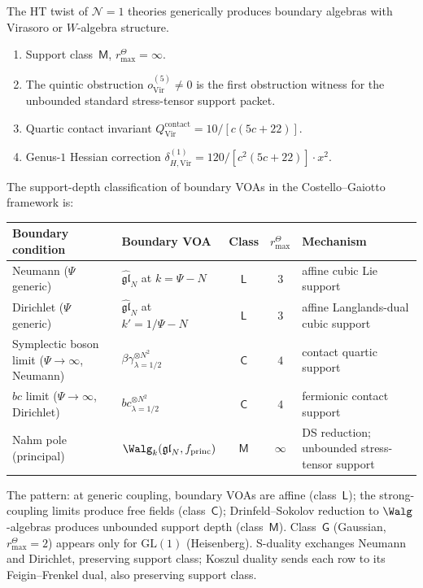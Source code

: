 \begin{example}[$\mathcal{N}=1$: Virasoro/W-type]
\label{ex:ht-n1}
The HT twist of $\mathcal{N}=1$ theories generically produces
boundary algebras with Virasoro or $W$-algebra structure.
\begin{enumerate}[label=\textup{(\roman*)}]
\item Support class~$\mathsf{M}$, \(r^\Theta_{\max}=\infty\).
\item The quintic obstruction $o^{(5)}_{\mathrm{Vir}} \neq 0$
 is the first obstruction witness for the unbounded standard
 stress-tensor support packet.
\item Quartic contact invariant
 $Q^{\mathrm{contact}}_{\mathrm{Vir}} = 10/[c(5c+22)]$.
\item Genus-$1$ Hessian correction
 $\delta^{(1)}_{H,\mathrm{Vir}} = 120/[c^2(5c+22)] \cdot x^2$.
\end{enumerate}
\end{example}

\begin{remark}
\label{rem:boundary-voa-shadow-depth-classification}
The support-depth classification of boundary VOAs in the
Costello--Gaiotto framework is:
\begin{center}
\renewcommand{\arraystretch}{1.25}
\small
\begin{tabular}{@{}l@{\;\;}l@{\;\;}c@{\;\;}c@{\;\;}l@{}}
\textbf{Boundary condition}
 & \textbf{Boundary VOA}
 & \textbf{Class}
 & \(r^\Theta_{\max}\)
 & \textbf{Mechanism} \\
\midrule
Neumann ($\Psi$ generic)
 & $\widehat{\mathfrak{gl}}_N$ at $k = \Psi - N$
 & $\mathsf{L}$
 & $3$
 & affine cubic Lie support \\
Dirichlet ($\Psi$ generic)
 & $\widehat{\mathfrak{gl}}_N$ at $k' = 1/\Psi - N$
 & $\mathsf{L}$
 & $3$
 & affine Langlands-dual cubic support \\
Symplectic boson limit ($\Psi\to\infty$, Neumann)
 & $\beta\gamma^{\otimes N^2}_{\lambda=1/2}$
 & $\mathsf{C}$
 & $4$
 & contact quartic support \\
$bc$ limit ($\Psi\to\infty$, Dirichlet)
 & $bc^{\otimes N^2}_{\lambda=1/2}$
 & $\mathsf{C}$
 & $4$
 & fermionic contact support \\
Nahm pole (principal)
 & $\Walg_k(\mathfrak{gl}_N, f_{\mathrm{princ}})$
 & $\mathsf{M}$
 & $\infty$
 & DS reduction; unbounded stress-tensor support
\end{tabular}
\end{center}
The pattern: at generic coupling, boundary VOAs are affine
(class~$\mathsf{L}$); the strong-coupling limits produce free
fields (class~$\mathsf{C}$); Drinfeld--Sokolov reduction to
$\Walg$-algebras produces unbounded support depth
(class~$\mathsf{M}$).
Class~$\mathsf{G}$ (Gaussian, \(r^\Theta_{\max}=2\)) appears only
for $\mathrm{GL}(1)$ (Heisenberg).
S-duality exchanges Neumann and Dirichlet, preserving support
class; Koszul duality sends each row to its Feigin--Frenkel
dual, also preserving support class.
\end{remark}

